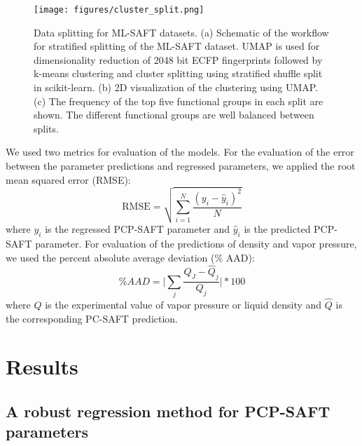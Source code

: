 \begin{figure}
    \centering
    \texttt{[image: figures/cluster\_split.png]}
    \caption{Data splitting for ML-SAFT datasets. (a) Schematic of the workflow for stratified splitting of the ML-SAFT dataset. UMAP\cite{McInnes2018} is used for dimensionality reduction of 2048 bit ECFP fingerprints followed by k-means clustering\cite{MacQueen1967} and cluster splitting using stratified shuffle split in scikit-learn.\cite{scikit-learn} (b) 2D visualization of the clustering using UMAP. (c) The frequency of the top five functional groups in each split are shown. The different functional groups are well balanced between splits.}
    \label{fig:splitting}
\end{figure}

We used two metrics for evaluation of the models. For the evaluation of the error between the parameter predictions and regressed parameters, we applied the root mean squared error (RMSE):
\begin{equation}
    \text{RMSE} = \sqrt{\sum_{i=1}^N \frac{(y_i - \hat y_i)^2}{N}}
\end{equation}
where $y_i$ is the regressed PCP-SAFT parameter and $\hat y_i$ is the predicted PCP-SAFT parameter. For evaluation of the predictions of density and vapor pressure, we used the percent absolute average deviation (\% AAD):
\begin{equation}
    \% AAD = \biggl \vert \sum_j\frac{Q_J - \hat Q_j}{Q_j} \biggr \vert * 100
\end{equation}
where $Q$ is the experimental value of vapor pressure or liquid density and $\hat Q$ is the corresponding PC-SAFT prediction.


\section{Results}


\subsection{A robust regression method for PCP-SAFT parameters}

